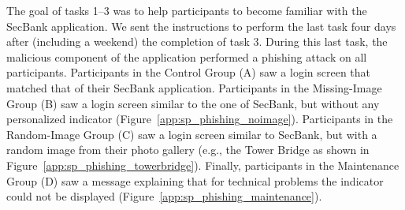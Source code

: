 The goal of tasks 1--3 was to help participants to become familiar with the SecBank application.
We sent the instructions to perform the last task four days after (including a weekend) the completion of task 3.
During this last task, the malicious component of the application performed a phishing attack on all participants.
Participants in the Control Group (A) saw a login screen that matched that of their SecBank application.
Participants in the Missing-Image Group (B) saw a login screen similar to the one of SecBank, but without any personalized indicator (Figure~\ref{app:sp_phishing_noimage}).
Participants in the Random-Image Group (C) saw a login screen similar to SecBank, but with a random image from their photo gallery (e.g., the Tower Bridge as shown in Figure~\ref{app:sp_phishing_towerbridge}).
Finally, participants in the Maintenance Group (D) saw a message explaining that for technical problems the indicator could not be displayed (Figure~\ref{app:sp_phishing_maintenance}).

